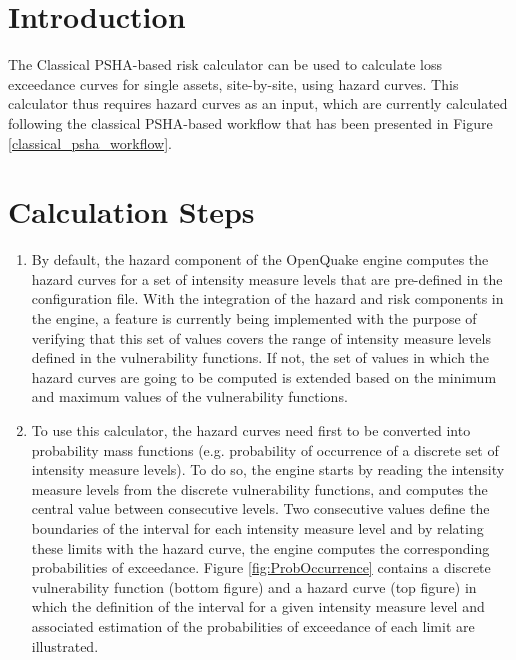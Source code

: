\section{Introduction}
The Classical PSHA-based risk calculator can be used to calculate loss exceedance curves for single assets, site-by-site, using hazard curves. This calculator thus requires hazard curves as an input, which are currently calculated following the classical PSHA-based workflow that has been presented in Figure \ref{classical_psha_workflow}.

\section{Calculation Steps}

\begin{enumerate}
\item By default, the hazard component of the OpenQuake engine computes the hazard curves for a set of intensity measure levels that are pre-defined in the configuration file. With the integration of the hazard and risk components in the engine, a feature is currently being implemented with the purpose of verifying that this set of values covers the range of intensity measure levels defined in the vulnerability functions. If not, the set of values in which the hazard curves are going to be computed is extended based on the minimum and maximum values of the vulnerability functions.

\item To use this calculator, the hazard curves need first to be converted into probability mass functions (e.g. probability of occurrence of a discrete set of intensity measure levels). To do so, the engine starts by reading the intensity measure levels from the discrete vulnerability functions, and computes the central value between consecutive levels. Two consecutive values define the boundaries of the interval for each intensity measure level and by relating these limits with the hazard curve, the engine computes the corresponding probabilities of exceedance. Figure \ref{fig:ProbOccurrence} contains a discrete vulnerability function (bottom figure) and a hazard curve (top figure) in which the definition of the interval for a given intensity measure level and associated estimation of the probabilities of exceedance of each limit are illustrated. 


\end{enumerate}
